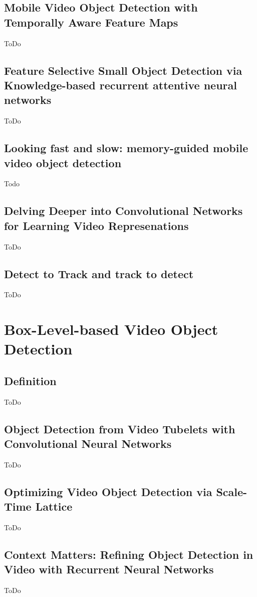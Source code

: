 \documentclass[conference]{IEEEtran}
\begin{document}
\subsection{Mobile Video Object Detection with Temporally Aware Feature Maps}
ToDo

\subsection{Feature Selective Small Object Detection via Knowledge-based recurrent attentive neural networks}
ToDo

\subsection{Looking fast and slow: memory-guided mobile video object detection}
Todo

\subsection{Delving Deeper into Convolutional Networks for Learning Video Represenations}
ToDo

\subsection{Detect to Track and track to detect}
ToDo

\section{Box-Level-based Video Object Detection}

\subsection{Definition}
ToDo

\subsection{Object Detection from Video Tubelets with Convolutional Neural Networks}
ToDo

\subsection{Optimizing Video Object Detection via Scale-Time Lattice}
ToDo

\subsection{Context Matters: Refining Object Detection in Video with Recurrent Neural Networks}
ToDo
\end{document}
